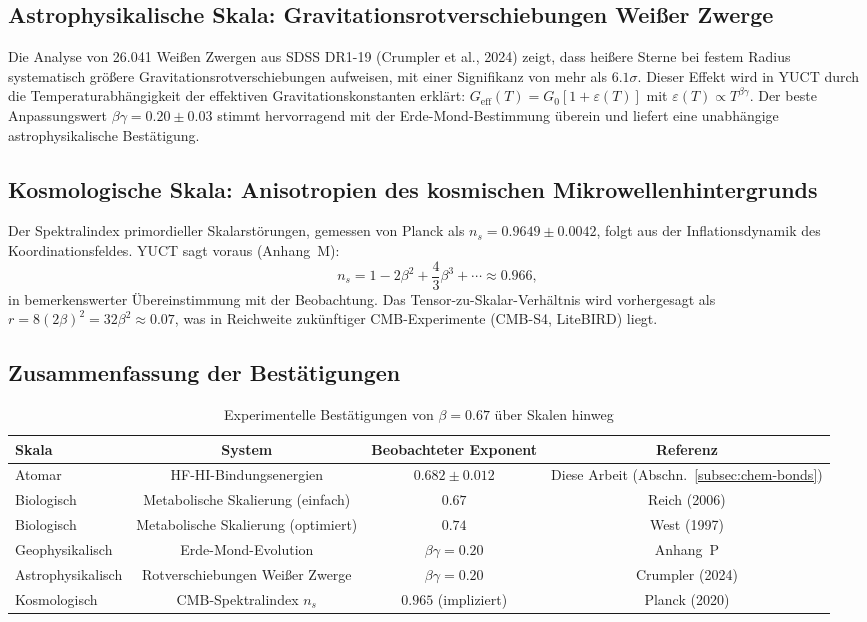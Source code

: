 \documentclass[11pt,a4paper]{article}
\begin{document}
	\subsection{Astrophysikalische Skala: Gravitationsrotverschiebungen Weißer Zwerge}
	\label{subsec:wd}
	
	Die Analyse von 26.041 Weißen Zwergen aus SDSS DR1-19 (Crumpler et al., 2024) zeigt, dass heißere Sterne bei festem Radius systematisch größere Gravitationsrotverschiebungen aufweisen, mit einer Signifikanz von mehr als \(6.1\sigma\). Dieser Effekt wird in YUCT durch die Temperaturabhängigkeit der effektiven Gravitationskonstanten erklärt: \(G_{\mathrm{eff}}(T) = G_0[1 + \varepsilon(T)]\) mit \(\varepsilon(T) \propto T^{\beta\gamma}\). Der beste Anpassungswert \(\beta\gamma = 0.20 \pm 0.03\) stimmt hervorragend mit der Erde-Mond-Bestimmung überein und liefert eine unabhängige astrophysikalische Bestätigung.
	
	\subsection{Kosmologische Skala: Anisotropien des kosmischen Mikrowellenhintergrunds}
	\label{subsec:cmb}
	
	Der Spektralindex primordieller Skalarstörungen, gemessen von Planck als \(n_s = 0.9649 \pm 0.0042\), folgt aus der Inflationsdynamik des Koordinationsfeldes. YUCT sagt voraus (Anhang~M):
	\[
	n_s = 1 - 2\beta^2 + \frac{4}{3}\beta^3 + \cdots \approx 0.966,
	\]
	in bemerkenswerter Übereinstimmung mit der Beobachtung. Das Tensor-zu-Skalar-Verhältnis wird vorhergesagt als \(r = 8(2\beta)^2 = 32\beta^2 \approx 0.07\), was in Reichweite zukünftiger CMB-Experimente (CMB-S4, LiteBIRD) liegt.
	
	\subsection{Zusammenfassung der Bestätigungen}
	
	\begin{table}[h]
		\centering
		\caption{Experimentelle Bestätigungen von \(\beta = 0.67\) über Skalen hinweg}
		\label{tab:confirmations}
		\begin{tabular}{lccc}
			\toprule
			Skala & System & Beobachteter Exponent & Referenz \\
			\midrule
			Atomar & HF-HI-Bindungsenergien & \(0.682 \pm 0.012\) & Diese Arbeit (Abschn.~\ref{subsec:chem-bonds}) \\
			Biologisch & Metabolische Skalierung (einfach) & \(0.67\) & Reich (2006) \\
			Biologisch & Metabolische Skalierung (optimiert) & \(0.74\) & West (1997) \\
			Geophysikalisch & Erde-Mond-Evolution & \(\beta\gamma = 0.20\) & Anhang~P \\
			Astrophysikalisch & Rotverschiebungen Weißer Zwerge & \(\beta\gamma = 0.20\) & Crumpler (2024) \\
			Kosmologisch & CMB-Spektralindex \(n_s\) & \(0.965\) (impliziert) & Planck (2020) \\
			\bottomrule
		\end{tabular}
	\end{table}
	
\end{document}
